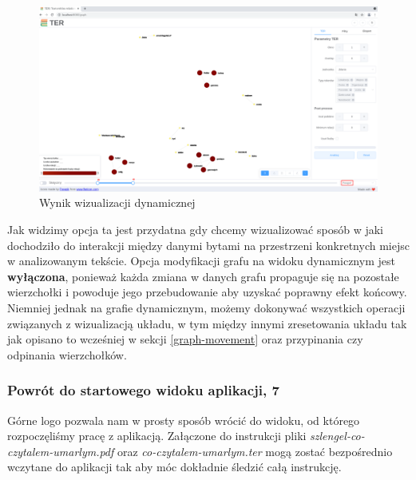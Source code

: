 \documentclass[12pt, a4paper]{article}
\begin{document}
\begin{figure}[H]
    \centering
    \includegraphics[width=\linewidth]{images/graph-dynamic.png}
    \caption{Wynik wizualizacji dynamicznej}
\end{figure}

Jak widzimy opcja ta jest przydatna gdy chcemy wizualizować sposób w jaki dochodziło do interakcji między danymi bytami na przestrzeni konkretnych miejsc w analizowanym tekście. Opcja modyfikacji grafu na widoku dynamicznym jest \textbf{wyłączona}, ponieważ każda zmiana w danych grafu propaguje się na pozostałe wierzchołki i powoduje jego przebudowanie aby uzyskać poprawny efekt końcowy. Niemniej jednak na grafie dynamicznym, możemy dokonywać wszystkich operacji związanych z wizualizacją układu, w tym między innymi zresetowania układu tak jak opisano to wcześniej w sekcji \ref{graph-movement} oraz przypinania czy odpinania wierzchołków. 

\subsubsection{Powrót do startowego widoku aplikacji, 7}

Górne logo pozwala nam w prosty sposób wrócić do widoku, od którego rozpoczęliśmy pracę z aplikacją. Załączone do instrukcji pliki \textit{szlengel-co-czytalem-umarlym.pdf} oraz \textit{co-czytalem-umarlym.ter} mogą zostać bezpośrednio wczytane do aplikacji tak aby móc dokładnie śledzić całą instrukcję.


\end{document}
